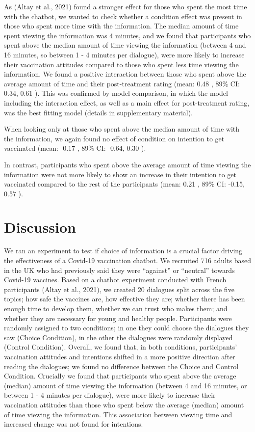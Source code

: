 \documentclass[
  english,
  ,jou,floatsintext]{apa6}
\begin{document}
As (Altay et al., 2021) found a stronger effect for those who spent the most time with the chatbot, we wanted to check whether a condition effect was present in those who spent more time with the information. The median amount of time spent viewing the information was 4 minutes, and we found that participants who spent above the median amount of time viewing the information (between 4 and 16 minutes, so between 1 - 4 minutes per dialogue), were more likely to increase their vaccination attitudes compared to those who spent less time viewing the information. We found a positive interaction between those who spent above the average amount of time and their post-treatment rating (mean: 0.48 , 89\% CI: 0.34, 0.61 ). This was confirmed by model comparison, in which the model including the interaction effect, as well as a main effect for post-treatment rating, was the best fitting model (details in supplementary material).

When looking only at those who spent above the median amount of time with the information, we again found no effect of condition on intention to get vaccinated (mean: -0.17 , 89\% CI: -0.64, 0.30 ).

In contrast, participants who spent above the average amount of time viewing the information were not more likely to show an increase in their intention to get vaccinated compared to the rest of the participants (mean: 0.21 , 89\% CI: -0.15, 0.57 ).

\hypertarget{discussion}{%
\section{Discussion}\label{discussion}}

We ran an experiment to test if choice of information is a crucial factor driving the effectiveness of a Covid-19 vaccination chatbot. We recruited 716 adults based in the UK who had previously said they were ``against'' or ``neutral'' towards Covid-19 vaccines. Based on a chatbot experiment conducted with French participants (Altay et al., 2021), we created 20 dialogues split across the five topics; how safe the vaccines are, how effective they are; whether there has been enough time to develop them, whether we can trust who makes them; and whether they are necessary for young and healthy people. Participants were randomly assigned to two conditions; in one they could choose the dialogues they saw (Choice Condition), in the other the dialogues were randomly displayed (Control Condition). Overall, we found that, in both conditions, participants' vaccination attitudes and intentions shifted in a more positive direction after reading the dialogues; we found no difference between the Choice and Control Condition. Crucially we found that participants who spent above the average (median) amount of time viewing the information (between 4 and 16 minutes, or between 1 - 4 minutes per dialogue), were more likely to increase their vaccination attitudes than those who spent below the average (median) amount of time viewing the information. This association between viewing time and increased change was not found for intentions.
\end{document}
